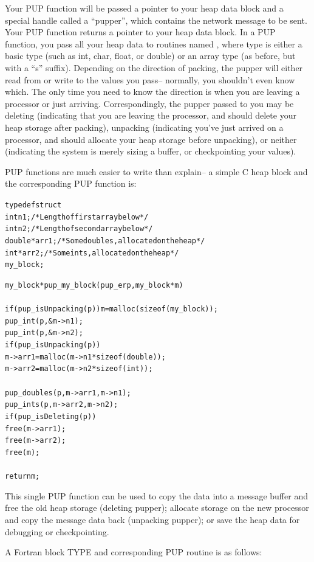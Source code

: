 \documentclass[10pt]{article}
\begin{document}
Your PUP function will be passed a pointer to your heap data block and a
special handle called a ``pupper'', which contains the network message to be
sent.  Your PUP function returns a pointer to your heap data block.  In a PUP
function, you pass all your heap data to routines named , where
type is either a basic type (such as int, char, float, or double) or an array
type (as before, but with a ``s'' suffix).  Depending on the direction of
packing, the pupper will either read from or write to the values you pass--
normally, you shouldn't even know which.  The only time you need to know the
direction is when you are leaving a processor or just arriving.
Correspondingly, the pupper passed to you may be deleting (indicating that you
are leaving the processor, and should delete your heap storage after packing),
unpacking (indicating you've just arrived on a processor, and should allocate
your heap storage before unpacking), or neither (indicating the system is
merely sizing a buffer, or checkpointing your values).

PUP functions are much easier to write than explain-- a simple C heap block
and the corresponding PUP function is:

\begin{alltt}
     typedef struct {
       int n1;/*Length of first array below*/
       int n2;/*Length of second array below*/
       double *arr1; /*Some doubles, allocated on the heap*/
       int *arr2; /*Some ints, allocated on the heap*/
     } my_block;
 
     my_block *pup_my_block(pup_er p,my_block *m)
     {
       if (pup_isUnpacking(p)) m=malloc(sizeof(my_block));
       pup_int(p,\&m->n1);
       pup_int(p,\&m->n2);
       if (pup_isUnpacking(p)) {
         m->arr1=malloc(m->n1*sizeof(double));
         m->arr2=malloc(m->n2*sizeof(int));
       }
       pup_doubles(p,m->arr1,m->n1);
       pup_ints(p,m->arr2,m->n2);
       if (pup_isDeleting(p)) {
         free(m->arr1);
         free(m->arr2);
         free(m);
       }
       return m;
     }
\end{alltt}

This single PUP function can be used to copy the  data into a
message buffer and free the old heap storage (deleting pupper); allocate
storage on the new processor and copy the message data back (unpacking pupper);
or save the heap data for debugging or checkpointing.

A Fortran block TYPE and corresponding PUP routine is as follows:
\end{document}
